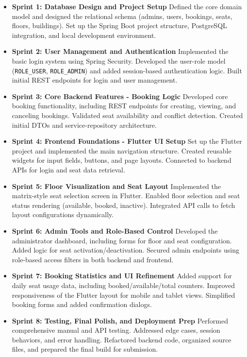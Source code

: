 \documentclass[12pt,a4paper]{report}
\begin{document}
\begin{itemize}
\item \textbf{Sprint 1: Database Design and Project Setup}
Defined the core domain model and designed the relational schema (admins, users, bookings, seats, floors, buildings). Set up the Spring Boot project structure, PostgreSQL integration, and local development environment.
\item \textbf{Sprint 2: User Management and Authentication}  
Implemented the basic login system using Spring Security. Developed the user-role model (\texttt{ROLE\_USER}, \texttt{ROLE\_ADMIN}) and added session-based authentication logic. Built initial REST endpoints for login and user management.

\item \textbf{Sprint 3: Core Backend Features - Booking Logic}  
Developed core booking functionality, including REST endpoints for creating, viewing, and canceling bookings. Validated seat availability and conflict detection. Created initial DTOs and service-repository architecture.

\item \textbf{Sprint 4: Frontend Foundations - Flutter UI Setup}  
Set up the Flutter project and implemented the main navigation structure. Created reusable widgets for input fields, buttons, and page layouts. Connected to backend APIs for login and seat data retrieval.

\item \textbf{Sprint 5: Floor Visualization and Seat Layout}  
Implemented the matrix-style seat selection screen in Flutter. Enabled floor selection and seat status rendering (available, booked, inactive). Integrated API calls to fetch layout configurations dynamically.

\item \textbf{Sprint 6: Admin Tools and Role-Based Control}  
Developed the administrator dashboard, including forms for floor and seat configuration. Added logic for seat activation/deactivation. Secured admin endpoints using role-based access filters in both backend and frontend.

\item \textbf{Sprint 7: Booking Statistics and UI Refinement}  
Added support for daily seat usage data, including booked/available/total counters. Improved responsiveness of the Flutter layout for mobile and tablet views. Simplified booking forms and added confirmation dialogs.

\item \textbf{Sprint 8: Testing, Final Polish, and Deployment Prep}  
Performed comprehensive manual and API testing. Addressed edge cases, session behaviors, and error handling. Refactored backend code, organized source files, and prepared the final build for submission.
\end{itemize}
\end{document}
